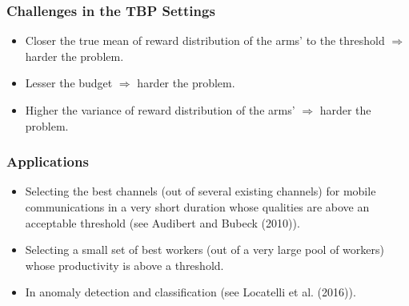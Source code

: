 \begin{frame}
\frametitle{Challenges in the TBP Settings}

\begin{itemize}
\item<1-> Closer the true mean of reward distribution of the arms' to the threshold $\Rightarrow$ harder the problem.
\item<2-> Lesser the budget $\Rightarrow$ harder the problem.
\item<3-> Higher the variance of reward distribution of the arms' $\Rightarrow$ harder the problem.
\end{itemize}

\end{frame}


\begin{frame}
\frametitle{Applications}
\begin{itemize}
\item<1-> Selecting the best channels (out of several existing channels) for mobile communications in a very short duration whose qualities are above an acceptable threshold (see Audibert and Bubeck (2010)).
\item<2-> Selecting a small set of best workers (out of a very large pool of workers) whose productivity is above a threshold.
\item<3-> In anomaly detection and classification (see {Locatelli et al. (2016)}).
\end{itemize}
\end{frame}

